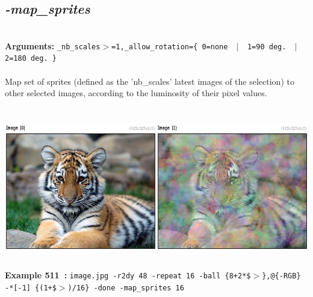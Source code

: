 \documentclass[a4paper,11pt,twoside]{book}
\begin{document}
\subsection{\emph{-map\_sprites} }\vspace*{-0.5em}
~\\\textbf{Arguments: } 
{\small \texttt{\_nb\_scales$>$=1,\_allow\_rotation=\{ 0=none ~$|$~ 1=90 deg. ~$|$~ 2=180 deg. \}}}\\~\\
Map set of sprites (defined as the 'nb\_scales' latest images of the selection) to other selected images,
according to the luminosity of their pixel values.
\begin{center}\includegraphics[keepaspectratio=true,height=7cm,width=\textwidth]{img/gmic_def511.jpg}\\
{\footnotesize \textbf{Example 511~:} \texttt{image.jpg -r2dy 48 -repeat 16 -ball \{8+2*\$$>$\},@\{-RGB\} -*[-1] \{(1+\$$>$)/16\} -done -map\_sprites 16}}
\end{center}
\end{document}
